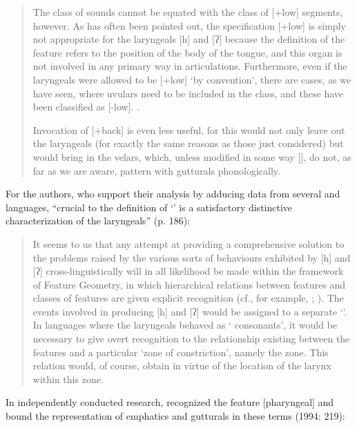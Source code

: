 \documentclass[output=paper]{langsci/langscibook}
\begin{document}
\begin{quote}
 The class of  sounds cannot be equated with the class of [+low] segments, however. As has often been pointed out, the specification [+low] is simply not appropriate for the laryngeals [h] and [ʔ] because the definition of the feature refers to the position of the body of the tongue, and this organ is not involved in any primary way in  articulations. Furthermore, even if the laryngeals were allowed to be [+low] ‘by convention’, there are cases, as we have seen, where uvulars need to be included in the class, and these have been classified as [-low]. \citet[cf.][305]{ChomskyHalle1968}.

Invocation of [+back] is even less useful, for this would not only leave out the laryngeals (for exactly the same reasons as those just considered) but would bring in the velars, which, unless modified in some way [\textellipsis], do not, as far as we are aware, pattern with gutturals phonologically. 
\end{quote}

For the authors, who support their analysis by adducing data from several  and  languages, “crucial to the definition of ‘’ is a satisfactory distinctive characterization of the laryngeals” (p. 186):

\begin{quote}
It seems to us that any attempt at providing a comprehensive solution to the problems raised by the various sorts of behaviours exhibited by [h] and [ʔ] cross-linguistically will in all likelihood be made within the framework of Feature Geometry, in which hierarchical relations between features and classes of features are given explicit recognition (cf., for example, \citealt{Clements1985}; \citealt{Sagey1986}). The events involved in producing [h] and [ʔ] would be assigned to a separate ‘’. In languages where the laryngeals behaved as ‘ consonants’, it would be necessary to give overt recognition to the relationship existing between the  features and a particular ‘zone of constriction’, namely the  zone. This relation would, of course, obtain in virtue of the location of the larynx within this zone.
\end{quote}

In independently conducted research, \citet{McCarthy1991,McCarthy1994} recognized the feature [pharyngeal] and bound the representation of emphatics and gutturals in these terms (1994: 219):
\end{document}
